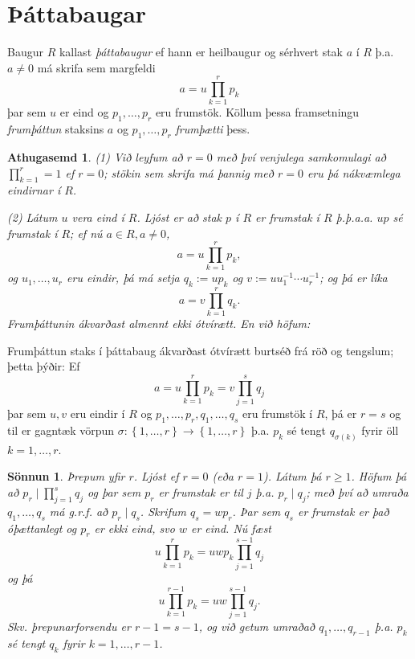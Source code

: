 \documentclass[a4paper,icelandic,11pt]{book}
\theoremstyle{plain}
\newtheorem*{ath}{Athugasemd}
\newtheorem*{sonnun}{Sönnun}
\begin{document}
\section{Þáttabaugar}
\begin{skilgr}
  Baugur $R$ kallast
  \emph{þáttabaugur}
  ef hann er heilbaugur og sérhvert stak $a$ í $R$ þ.a. $a\neq 0$ má skrifa sem
  margfeldi\[
  a = u \prod_{k=1}^{r}p_k
  \]
  þar sem $u$ er eind og $p_1,\dots,p_r$ eru frumstök. Köllum þessa framsetningu
  \emph{frumþáttun} staksins $a$ og $p_1,\dots,p_r$
  \emph{frumþætti} þess.
\end{skilgr}
\begin{ath}
  (1) Við leyfum að $r=0$ með því venjulega samkomulagi að $\prod_{k=1}^r = 1$
  ef $r=0$; stökin sem skrifa má þannig með $r=0$ eru þá nákvæmlega eindirnar í
  $R$.

  (2) Látum $u$ vera eind í $R$. Ljóst er að stak $p$ í $R$ er frumstak í $R$
  þ.þ.a.a. $up$ sé frumstak í $R$; ef nú $a\in R, a\neq 0$,\[
  a = u\prod_{k=1}^r p_k,
  \]
  og $u_1,\dots,u_r$ eru eindir, þá má setja $q_k:=up_k$ og $v:=uu_1^{-1}\cdots
  u_r^{-1}$; og þá er líka\[
  a = v \prod_{k=1}^r q_k.
  \]
  Frumþáttunin ákvarðast almennt ekki ótvírætt. En við höfum:
\end{ath}
\begin{setn}
  Frumþáttun staks í þáttabaug ákvarðast ótvírætt burtséð frá röð og tengslum;
  þetta þýðir: Ef\[
  a = u\prod_{k=1}^r p_k = v\prod_{j=1}^s q_j
  \]
  þar sem $u,v$ eru eindir í $R$ og $p_1,\dots,p_r,q_1,\dots,q_s$ eru frumstök í
  $R$, þá er $r=s$ og til er gagntæk vörpun $\sigma:\left\{ 1,\dots,r
  \right\}\to\left\{ 1,\dots,r \right\}$ þ.a. $p_k$ sé tengt $q_{\sigma(k)}$
  fyrir öll $k=1,\dots,r$.
\end{setn}
\begin{sonnun}
  Þrepum yfir $r$. Ljóst ef $r=0$ (eða $r=1$). Látum þá $r\geq 1$. Höfum þá að
  $p_r\mid \prod_{j=1}^s q_j$ og þar sem $p_r$ er frumstak  er til $j$ þ.a.
  $p_r\mid q_j$; með því að umraða $q_1,\dots,q_s$ má g.r.f. að $p_r\mid q_s$. Skrifum
  $q_s=wp_r$. Þar sem $q_s$ er frumstak er það óþættanlegt og $p_r$ er ekki
  eind, svo $w$ er eind. Nú fæst\[
  u\prod_{k=1}^r p_k = uwp_k \prod_{j=1}^{s-1}q_j
  \]
  og þá\[
  u\prod_{k=1}^{r-1} p_k = uw \prod_{j=1}^{s-1}q_j.
  \]
  Skv. þrepunarforsendu er $r-1=s-1$, og við getum umraðað
  $q_1,\dots,q_{r-1}$ þ.a. $p_k$ sé tengt $q_k$ fyrir $k=1,\dots,r-1$.
\end{sonnun}
\end{document}
